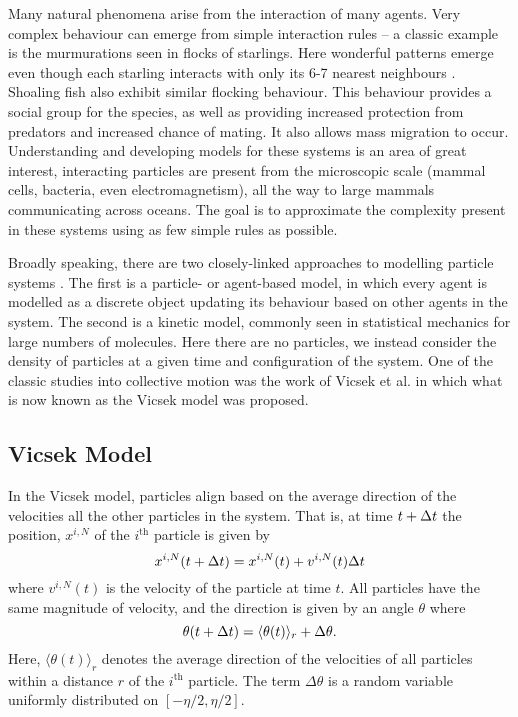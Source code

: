 Many natural phenomena arise from the interaction of many agents. Very complex behaviour can emerge from simple interaction rules -- a classic example is the murmurations seen in flocks of starlings. Here wonderful patterns emerge even though each starling interacts with only its 6-7 nearest neighbours \cite{Ballerini08}. Shoaling fish also exhibit similar flocking behaviour. This behaviour provides a social group for the species, as well as providing increased protection from predators and increased chance of mating. It also allows mass migration to occur. Understanding and developing models for these systems is an area of great interest, interacting particles are present from the microscopic scale (mammal cells, bacteria, even electromagnetism), all the way to large mammals communicating across oceans. The goal is to approximate the complexity present in these systems using as few simple rules as possible.

Broadly speaking, there are two closely-linked approaches to modelling particle systems \cite{Berdahl17}. The first is a particle- or agent-based model, in which every agent is modelled as a discrete object updating its behaviour based on other agents in the system. The second is a kinetic model, commonly seen in statistical mechanics for large numbers of molecules. Here there are no particles, we instead consider the density of particles at a given time and configuration of the system. One of the classic studies into collective motion was the work of Vicsek et al. \cite{Vicsek95} in which what is now known as the Vicsek model was proposed.

\subsection{Vicsek Model}
In the Vicsek model, particles align based on the average direction of the velocities all the other particles in the system. That is, at time $t+\Delta t$ the position, $x^{i,N}$ of the $i^{\text{th}}$ particle is given by
\[ x^{i,N}(t+\Delta t) =     x^{i,N}(t) + v^{i,N}(t)\Delta t\]
where $v^{i,N}(t)$ is the velocity of the particle at time $t$. All particles have the same magnitude of velocity, and the direction is given by an angle $\theta$ where
\[\theta(t+\Delta t) = \langle \theta(t)\rangle_r + \Delta \theta.\]
Here, $\langle \theta(t)\rangle_r$ denotes the average direction of the velocities of all particles within a distance $r$ of the $i^{\text{th}}$ particle. The term $\Delta \theta$ is a random variable uniformly distributed on $[-\eta/2,\eta/2]$.

